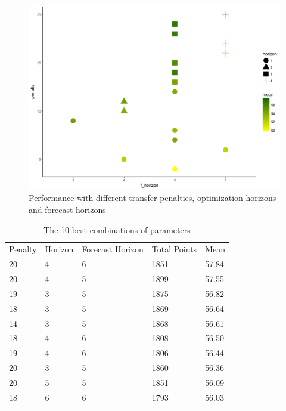 \begin{figure}[H]
    \centering
    \includegraphics[scale=0.55]{fig/chapter_6/paramter_choice.png}
    \caption{Performance with different transfer penalties, optimization horizons and forecast horizons}
\label{Parameter_choice}    
\end{figure}

\begin{table}[H]
\centering
\caption{The 10 best combinations of parameters}
\label{tab:top_10}
\begin{tabular}{lllll}
Penalty & Horizon & Forecast Horizon & Total Points & Mean  \\
20      & 4       & 6                & 1851         & 57.84 \\
20      & 4       & 5                & 1899         & 57.55 \\
19      & 3       & 5                & 1875         & 56.82 \\
18      & 3       & 5                & 1869         & 56.64 \\
14      & 3       & 5                & 1868         & 56.61 \\
18      & 4       & 6                & 1808         & 56.50 \\
19      & 4       & 6                & 1806         & 56.44 \\
20      & 3       & 5                & 1860         & 56.36 \\
20      & 5       & 5                & 1851         & 56.09 \\
18      & 6       & 6                & 1793         & 56.03
\end{tabular}
\end{table}

